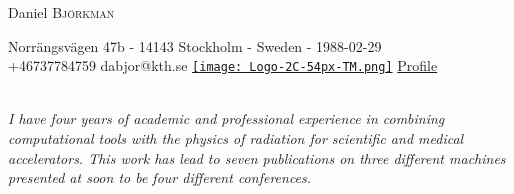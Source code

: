 \documentclass[a4paper,10pt]{article}
\begin{document}





\pagestyle{empty} %
 
\par{\centering
        {\Huge Daniel \textsc{Björkman}}
        
        Norrängsvägen 47b - 14143 Stockholm - Sweden - 1988-02-29\\
        
    \phone \enspace +46737784759 \enspace \textbullet \enspace \Envelope \enspace dabjor@kth.se \textbullet \enspace  \href{http://www.linkedin.com/in/danielbjorkman88}{\texttt{[image: Logo-2C-54px-TM.png]}} \href{http://www.linkedin.com/in/danielbjorkman88}{Profile}
    \\ \\
   
    \centering
 
    \bigskip\par
    }
  
 
 
\emph{I have four years of academic and professional experience in combining computational tools with the physics of radiation for scientific and medical accelerators. This work has lead to seven publications on three different machines presented at soon to be four different conferences.}
 
\end{document}
